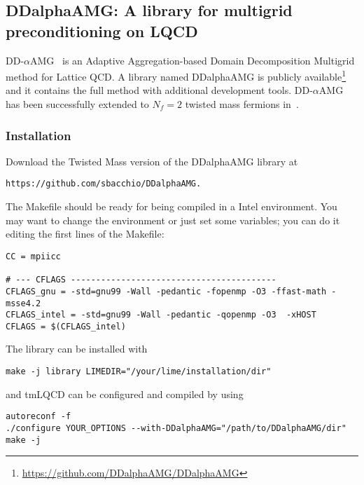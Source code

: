 
\subsection{DDalphaAMG: A library for multigrid preconditioning on LQCD}


DD-$\alpha$AMG~\cite{Frommer:2013fsa} is an Adaptive Aggregation-based Domain Decomposition Multigrid method for Lattice QCD. A library named DDalphaAMG is publicly available\footnote{\url{https://github.com/DDalphaAMG/DDalphaAMG}} and it contains the full method with additional development tools. DD-$\alpha$AMG has been successfully extended to $N_f=2$ twisted mass fermions in~\cite{Alexandrou:2016izb}.


\subsubsection{Installation}

Download the Twisted Mass version of the DDalphaAMG library at 
\begin{Verbatim}[fontsize=\small]
https://github.com/sbacchio/DDalphaAMG.
\end{Verbatim}
The Makefile should be ready for being compiled in a Intel environment. You may want to change the environment or just set some variables; you can do it editing the first lines of the Makefile:
\begin{Verbatim}[fontsize=\small]
CC = mpiicc

# --- CFLAGS -----------------------------------------                          
CFLAGS_gnu = -std=gnu99 -Wall -pedantic -fopenmp -O3 -ffast-math -msse4.2
CFLAGS_intel = -std=gnu99 -Wall -pedantic -qopenmp -O3  -xHOST
CFLAGS = $(CFLAGS_intel)
\end{Verbatim}
The library can be installed with
\begin{Verbatim}[fontsize=\small]
make -j library LIMEDIR="/your/lime/installation/dir" 
\end{Verbatim}
and tmLQCD can be configured and compiled by using
\begin{Verbatim}[fontsize=\small]
autoreconf -f
./configure YOUR_OPTIONS --with-DDalphaAMG="/path/to/DDalphaAMG/dir"
make -j
\end{Verbatim}

